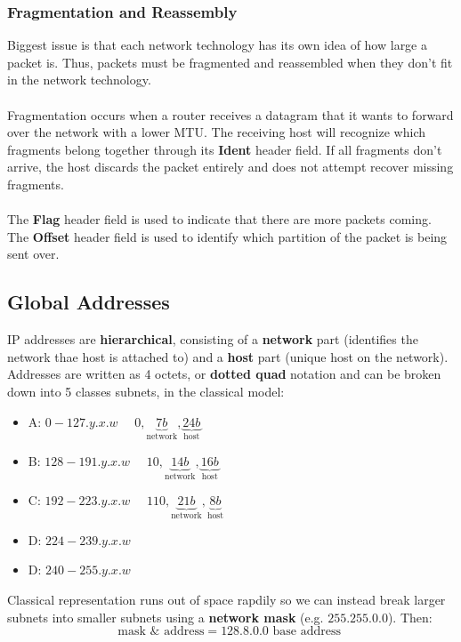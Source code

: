 \documentclass{article}
\begin{document}
  \subsubsection{Fragmentation and Reassembly}
  Biggest issue is that each network technology has its own idea of how large a packet is. Thus, packets must be fragmented and reassembled when they don't fit in the network technology. \\ \\
  Fragmentation occurs when a router receives a datagram that it wants to forward over the network with a lower MTU. The receiving host will recognize which fragments belong together through its \textbf{Ident} header field. If all fragments don't arrive, the host discards the packet entirely and does not attempt recover missing fragments. \\ \\
  The \textbf{Flag} header field is used to indicate that there are more packets coming. The \textbf{Offset} header field is used to identify which partition of the packet is being sent over.
  \subsection{Global Addresses}
  IP addresses are \textbf{hierarchical}, consisting of a \textbf{network} part (identifies the network thae host is attached to) and a \textbf{host} part (unique host on the network). Addresses are written as 4 octets, or \textbf{dotted quad} notation and can be broken down into 5 classes subnets, in the classical model:
  \begin{itemize}
    \item A: $0-127.y.x.w$ $\quad 0, \underbrace{7b}_{\text{network}}, \underbrace{24b}_{\text{host}}$
    \item B: $128 - 191.y.x.w$ $\quad 10, \underbrace{14b}_{\text{network}}, \underbrace{16b}_{\text{host}}$
    \item C: $192-223.y.x.w$ $\quad 110, \underbrace{21b}_{\text{network}}, \underbrace{8b}_{\text{host}}$
    \item D: $224-239.y.x.w$
    \item D: $240-255.y.x.w$
  \end{itemize}
  Classical representation runs out of space rapdily so we can instead break larger subnets into smaller subnets using a \textbf{network mask} (e.g. $255.255.0.0$). Then:
  \[\text{mask } \& \text{ address} = 128.8.0.0 \text{ base address }\]
\end{document}
